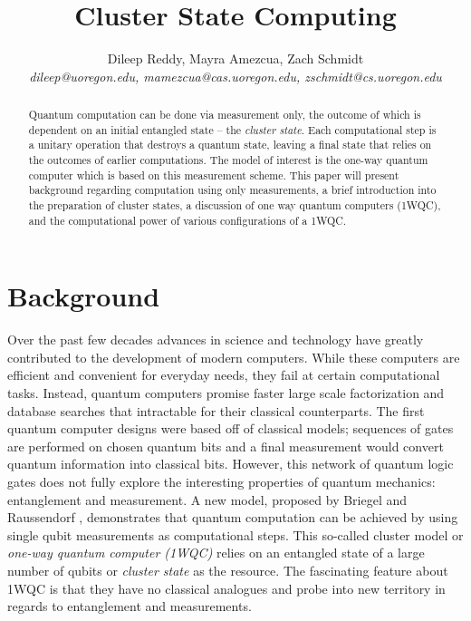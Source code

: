 \documentclass[twocolumn]{IEEEtran11}
\begin{document}


\title{\Large \bf Cluster State Computing}
\author{
Dileep Reddy, Mayra Amezcua, Zach Schmidt \\
{\em dileep@uoregon.edu, mamezcua@cas.uoregon.edu, zschmidt@cs.uoregon.edu }
}
\maketitle

\begin{abstract}
Quantum computation can be done via measurement only, the outcome of which is dependent on an initial entangled state -- the \textit{cluster state}. Each computational step is a unitary operation that destroys a quantum state, leaving a final state that relies on the outcomes of earlier computations. The model of interest is the one-way quantum computer which is based on this measurement scheme. This paper will present background regarding computation using only measurements, a brief introduction into the preparation of cluster states, a discussion of one way quantum computers (1WQC), and the computational power of various configurations of a 1WQC.
\end{abstract}


\section{Background}
Over the past few decades advances in science and technology have greatly contributed to the development of modern computers. While these computers are efficient and convenient for everyday needs, they fail at certain computational tasks. Instead, quantum computers promise faster large scale factorization and database searches that intractable for their classical counterparts. The first quantum computer designs were based off of classical models; sequences of gates are performed on chosen quantum bits and a final measurement would convert quantum information into classical bits. However, this network of quantum logic gates does not fully explore the interesting properties of quantum mechanics: entanglement and measurement. A new model, proposed by Briegel and Raussendorf \cite{briegel2000measurements}, demonstrates that quantum computation can be achieved by using single qubit measurements as computational steps. This so-called cluster model or \textit{one-way quantum computer (1WQC)} relies on an entangled state of a large number of qubits or \textit{cluster state} as the resource. The fascinating feature about 1WQC is that they have no classical analogues and probe into new territory in regards to entanglement and measurements. 
\end{document}
